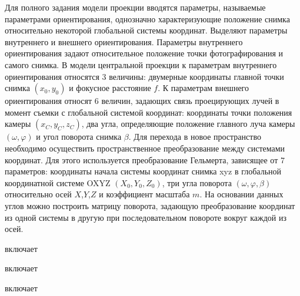 Для полного задания модели проекции вводятся параметры, называемые параметрами ориентирования, однозначно характеризующие положение снимка относительно некоторой глобальной системы координат. Выделяют параметры внутреннего и внешнего ориентирования. Параметры внутреннего ориентирования задают относительное положение точки фотографирования и самого снимка. В модели центральной проекции к параметрам внутреннего ориентирования относятся 3 величины: двумерные координаты главной точки снимка $(x_0,y_0)$ и фокусное расстояние $f$. К параметрам внешнего ориентирования относят 6 величин, задающих связь проецирующих лучей в момент съемки с глобальной системой координат: координаты точки положения камеры $(x_C,y_C,z_C)$, два угла, определяющие положение главного луча камеры $(\omega,\varphi)$ и угол поворота снимка $\beta$. Для перехода в новое пространство необходимо осуществить пространственное преобразование между системами координат. Для этого используется преобразование Гельмерта, зависящее от 7 параметров: координаты начала системы координат снимка xyz в глобальной координатной системе OXYZ $(X_0,Y_0,Z_0)$, три угла поворота $(\omega,\varphi, \beta)$ относительно осей $X$,$Y$,$Z$ и коэффициент масштаба $m$. На основании данных углов можно построить матрицу поворота, задающую преобразование координат из одной системы в другую при последовательном повороте вокруг каждой из осей.

\begin{SCn}
    \begin{scnrelfromset}{включает}
        \begin{scnrelfromset}{включает}
        \end{scnrelfromset}
        \begin{scnrelfromset}{включает}
        \end{scnrelfromset}
    \end{scnrelfromset}
\end{SCn}

